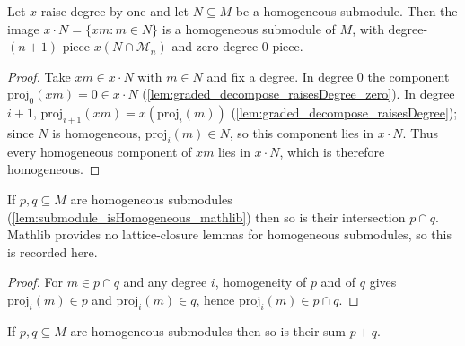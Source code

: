 \begin{lemma}
  \label{lem:graded_map_isHomogeneous}
  Let \(x\) raise degree by one and let \(N \subseteq M\) be a homogeneous submodule.
  Then the image \(x \cdot N = \{x m : m \in N\}\) is a homogeneous submodule of
  \(M\), with degree-\((n+1)\) piece \(x(N \cap \mathcal{M}_n)\) and zero
  degree-\(0\) piece.
\end{lemma}

\begin{proof}
    \leanok
  Take \(x m \in x \cdot N\) with \(m \in N\) and fix a degree. In degree \(0\) the
  component \(\mathrm{proj}_0(x m) = 0 \in x \cdot N\)
  (\cref{lem:graded_decompose_raisesDegree_zero}). In degree \(i+1\),
  \(\mathrm{proj}_{i+1}(x m) = x(\mathrm{proj}_i(m))\)
  (\cref{lem:graded_decompose_raisesDegree}); since \(N\) is homogeneous,
  \(\mathrm{proj}_i(m) \in N\), so this component lies in \(x \cdot N\). Thus every
  homogeneous component of \(x m\) lies in \(x \cdot N\), which is therefore
  homogeneous.
\end{proof}

\begin{lemma}
  \label{lem:graded_inf_isHomogeneous}
  If \(p, q \subseteq M\) are homogeneous submodules
  (\cref{lem:submodule_isHomogeneous_mathlib}) then so is their intersection \(p
  \cap q\). Mathlib provides no lattice-closure lemmas for homogeneous submodules, so
  this is recorded here.
\end{lemma}

\begin{proof}
  \leanok
  For \(m \in p \cap q\) and any degree \(i\), homogeneity of \(p\) and of \(q\)
  gives \(\mathrm{proj}_i(m) \in p\) and \(\mathrm{proj}_i(m) \in q\), hence
  \(\mathrm{proj}_i(m) \in p \cap q\).
\end{proof}

\begin{lemma}
  \label{lem:graded_sup_isHomogeneous}
  If \(p, q \subseteq M\) are homogeneous submodules then so is their sum \(p + q\).
\end{lemma}

